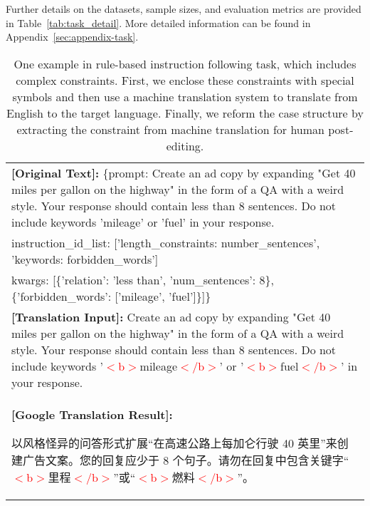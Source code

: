 Further details on the datasets, sample sizes, and evaluation metrics are provided in Table~\ref{tab:task_detail}.
More detailed information can be found in Appendix~\ref{sec:appendix-task}.


\begingroup
\renewcommand{\arraystretch}{1.3}
\begin{table}[t!]
    \caption{One example in rule-based instruction following task, which includes complex constraints. First, we enclose these constraints with special symbols and then use a machine translation system to translate from English to the target language. Finally, we reform the case structure by extracting the constraint from machine translation for human post-editing.}
    \label{tab:construction-case}
    \vskip 0.1in
    \centering 
    \tiny
    \begin{tabular}{|p{7.8cm}|}
        \hline
        \textbf{[Original Text]:} 
\{prompt: Create an ad copy by expanding "Get 40 miles per gallon on the highway" in the form of a QA with a weird style. Your response should contain less than 8 sentences. Do not include keywords 'mileage' or 'fuel' in your response. \\
instruction\_id\_list: ['length\_constraints: number\_sentences', 'keywords: forbidden\_words'] \\
kwargs: [\{'relation': 'less than', 'num\_sentences': 8\}, \{'forbidden\_words': ['mileage', 'fuel']\}]\} \\
        \hline
        
        \textbf{[Translation Input]:} 
Create an ad copy by expanding "Get 40 miles per gallon on the highway" in the form of a QA with a weird style. Your response should contain less than 8 sentences. Do not include keywords '\textcolor{red}{$<$b$>$}mileage\textcolor{red}{$<$/b$>$}' or '\textcolor{red}{$<$b$>$}fuel\textcolor{red}{$<$/b$>$}' in your response. \\
        \hline
        
        \textbf{[Google Translation Result]:} 
        \begin{CJK}{UTF8}{gbsn}以风格怪异的问答形式扩展“在高速公路上每加仑行驶 40 英里”来创建广告文案。您的回复应少于 8 个句子。请勿在回复中包含关键字“\textcolor{red}{$<$b$>$}里程\textcolor{red}{$<$/b$>$}”或“\textcolor{red}{$<$b$>$}燃料\textcolor{red}{$<$/b$>$}”。\end{CJK} \\
        
        

\end{tabular}
\end{table}
